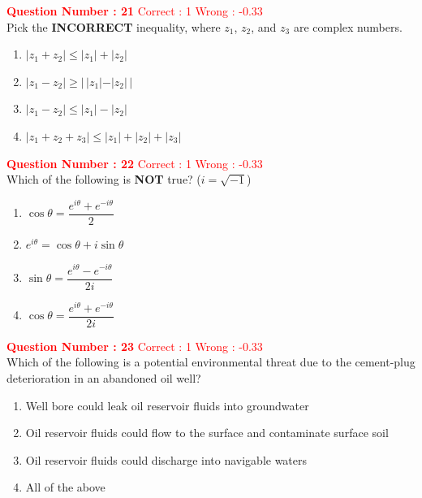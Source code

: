 \documentclass[12pt]{article}
\begin{document}
{\textbf{\textcolor{red}{Question Number : 21}} \hfill \textcolor{red}{Correct : 1  Wrong : -0.33} \\[1ex]
Pick the \textbf{INCORRECT} inequality, where $z_1$, $z_2$, and $z_3$ are complex numbers.

\begin{enumerate}[label=(\Alph*)]
    \item $|z_1 + z_2| \leq |z_1| + |z_2|$
    \item $|z_1 - z_2| \geq |\,|z_1| - |z_2|\,|$
    \item $|z_1 - z_2| \leq |z_1| - |z_2|$
    \item $|z_1 + z_2 + z_3| \leq |z_1| + |z_2| + |z_3|$
\end{enumerate}

\vspace{2ex}

\textbf{\textcolor{red}{Question Number : 22}} \hfill \textcolor{red}{Correct : 1  Wrong : -0.33} \\[1ex]
Which of the following is \textbf{NOT} true? \quad ($i = \sqrt{-1}$)

\begin{enumerate}[label=(\Alph*)]
    \item $\cos \theta = \dfrac{e^{i\theta} + e^{-i\theta}}{2}$
    \item $e^{i\theta} = \cos \theta + i \sin \theta$
    \item $\sin \theta = \dfrac{e^{i\theta} - e^{-i\theta}}{2i}$
    \item $\cos \theta = \dfrac{e^{i\theta} + e^{-i\theta}}{2i}$
\end{enumerate}

\vspace{2ex}

\newpage

\textbf{\textcolor{red}{Question Number : 23}} \hfill \textcolor{red}{Correct : 1 Wrong : -0.33} \\[1ex]
Which of the following is a potential environmental threat due to the cement-plug deterioration in an abandoned oil well?

\begin{enumerate}[label=(\Alph*)]
    \item Well bore could leak oil reservoir fluids into groundwater
    \item Oil reservoir fluids could flow to the surface and contaminate surface soil
    \item Oil reservoir fluids could discharge into navigable waters
    \item All of the above
\end{enumerate}

}
\end{document}
